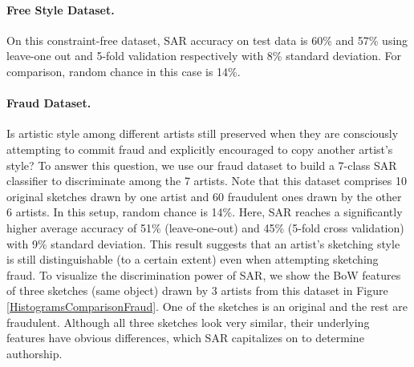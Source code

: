 \vspace{-3mm}
\paragraph{Free Style Dataset.} On this constraint-free dataset, SAR accuracy on test data is 60\% and 57\% using leave-one out and 5-fold validation respectively with 8\% standard deviation. For comparison, random chance in this case is 14\%.

\vspace{-3mm}
\paragraph{Fraud Dataset.} Is artistic style among different artists still preserved when they are consciously attempting to commit fraud and explicitly encouraged to copy another artist's style? To answer this question, we use our fraud dataset to build a 7-class SAR classifier to discriminate among the 7 artists. Note that this dataset comprises 10 original sketches drawn by one artist and 60 fraudulent ones drawn by the other 6 artists. In this setup, random chance is 14\%. Here, SAR reaches a significantly higher average accuracy of 51\% (leave-one-out) and 45\% (5-fold cross validation) with 9\% standard deviation. This result suggests that an artist's sketching style is still distinguishable (to a certain extent) even when attempting sketching fraud. To visualize the discrimination power of SAR, we show the BoW features of three sketches (same object) drawn by 3 artists from this dataset in Figure \ref{HistogramsComparisonFraud}. One of the sketches is an original and the rest are fraudulent. Although all three sketches look very similar, their underlying features have obvious differences, which SAR capitalizes on to determine authorship.


